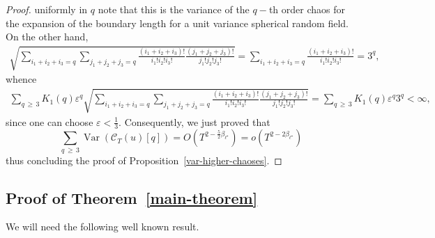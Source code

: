 \documentclass[AHL,Unicode,longabstracts,published]{cedram}
\newcommand{\clC}{\mathcal{C}}
\DeclareMathOperator{\Var}{Var}
\begin{document}
\begin{proof}
uniformly in $q$ note that this is the variance of the $q-$th order chaos for the expansion of the boundary length for a unit variance spherical random field. On the other hand,
\begin{align*}
\sqrt{\sum_{i_{1}+i_{2}+i_{3}=q}\sum_{j_{1}+j_{2}+j_{3}=q}\frac{\left(i_{1}+i_{2}+i_{3}\right)!}{i_{1}!i_{2}!i_{3}!}\frac{\left(j_{1}+j_{2}+j_{3}\right)!}{j_{1}!j_{2}!j_{3}!}} 
=\sum_{i_{1}+i_{2}+i_{3}=q}\frac{\left(i_{1}+i_{2}+i_{3}\right)!}{i_{1}!i_{2}!i_{3}!}= 3^{q},
\end{align*}
whence
\begin{align*}
\sum_{q\,\geq\,3}K_{1}(q)\varepsilon^{q}\sqrt{\sum_{i_{1}+i_{2}+i_{3}=q}
\sum_{j_{1}+j_{2}+j_{3}=q}\frac{\left(i_{1}+i_{2}+i_{3}\right)!}{i_{1}!i_{2}!i_{3}!}
\frac{\left(j_{1}+j_{2}+j_{3}\right)!}{j_{1}!j_{2}!j_{3}!}} 
=\sum_{q\,\geq\,3}K_{1}(q)\varepsilon^{q}3^{q}<\infty \text{,}
\end{align*}
since one can choose $\varepsilon <\frac{1}{3}$. Consequently, we just proved that
\begin{equation}\label{var-high}
\sum_{q\,\geq\,3}\Var(\clC_{T}(u)[q])=O\left(T^{2-\frac52
\beta _{\ell ^{\star }}}\right)=o\left(T^{2-2 \beta _{\ell ^{\star }}}\right)
\end{equation}
thus concluding the proof of Proposition~\ref{var-higher-chaoses}.
\end{proof}

\subsection{Proof of Theorem~\ref{main-theorem}}

We will need the following well known result.
\end{document}
